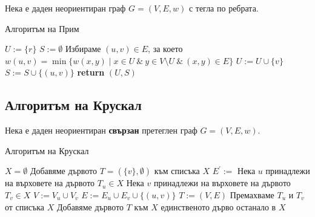 Нека е даден неориентиран граф $G = (V,E,w)$ с тегла по ребрата.

\begin{algorithm}[h!]
  \caption{Алгоритъм на Прим}

  \begin{algorithmic}[1]
    \State $U := \{r\}$
    \State $S := \emptyset$
    \State Избираме $(u,v) \in E$, за което
    \State $w(u,v) = \min\{w(x,y) \mid x\in U\ \&\ y \in V\setminus U\ \&\ (x,y) \in E\}$
    \State $U := U\cup\{v\}$
    \State $S := S \cup\{(u,v)\}$
    \EndWhile
    \State \textbf{return} $(U,S)$
    \EndProcedure
  \end{algorithmic}
\end{algorithm}


\subsection{Алгоритъм на Крускал}

Нека е даден неориентиран {\bf свързан} претеглен граф $G = (V,E,w)$.

\begin{algorithm}[h!]
  \caption{Алгоритъм на Крускал}

  \begin{algorithmic}[1]
    \State $X = \emptyset$
    \State Добавяме дървото $T = (\{v\},\emptyset)$ към списъка $X$
    \EndFor
    \State$E^\prime := $
    \Statex
    \State Нека $u$ принадлежи на върховете на дървото $T_u \in X$
    \State Нека $v$ принадлежи на върховете на дървото $T_v \in X$
    \State $V := V_u\cup V_v$
    \State $E := E_u\cup E_v\cup\{(u,v)\}$
    \State $T := (V,E)$
    \State Премахваме $T_u$ и $T_v$ от  списъка $X$
    \State Добавяме дървото $T$ към $X$
    \EndIf
    \EndFor
    \State \Return единственото дърво останало в $X$
    \EndProcedure
  \end{algorithmic}
\end{algorithm}


